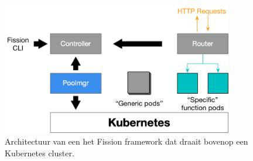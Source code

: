 \begin{figure}
    \includegraphics[width=0.9\textwidth]{img/fission-architectuur.png}
    \centering
    \caption{Architectuur van een het Fission framework dat draait bovenop een Kubernetes cluster. \autocite{Chemitiganti2018}}
    \label{fig:fission-architectuur}
\end{figure}

